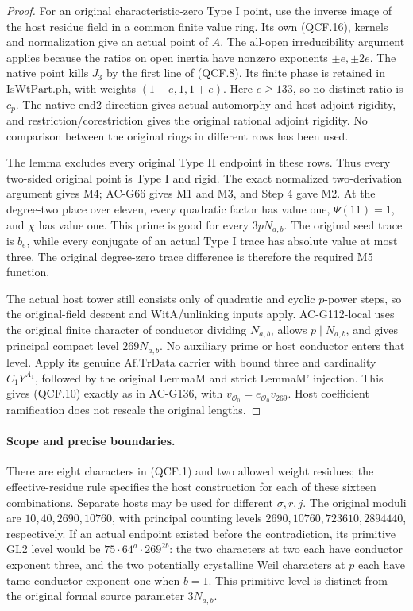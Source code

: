\begin{proof}
For an original characteristic-zero Type I point, use the
inverse image of the host residue field in a common finite
value ring.  Its own (QCF.16), kernels and normalization give
an actual point of \(A\).  The all-open irreducibility argument
applies because the ratios on open inertia have nonzero exponents
\(\pm e,\pm2e\).  The native point kills \(J_3\) by the first
line of (QCF.8).  Its finite phase is retained in
\(\mathrm{IsWtPart.ph}\), with weights \((1-e,1,1+e)\).
Here \(e\ge133\), so no distinct ratio is \(c_p\).
The native end2 direction gives actual automorphy and host
adjoint rigidity, and restriction/corestriction gives the
original rational adjoint rigidity.  No comparison between
the original rings in different rows has been used.

The lemma excludes every original Type II endpoint in these
rows.  Thus every two-sided original point is Type I and rigid.
The exact normalized two-derivation argument gives M4;
AC-G66 gives M1 and M3, and Step 4 gave M2.
At the degree-two place over eleven, every quadratic factor
has value one, \(\Psi(11)=1\), and \(\chi\) has value one.
This prime is good for every \(3pN_{a,b}\).  The original
seed trace is \(b_e\), while every conjugate of an actual
Type I trace has absolute value at most three.  The original
degree-zero trace difference is therefore the required M5 function.

The actual host tower still consists only of quadratic and
cyclic \(p\)-power steps, so the original-field descent and
WitA/unlinking inputs apply.  AC-G112-local uses the original
finite character of conductor dividing \(N_{a,b}\), allows
\(p\mid N_{a,b}\), and gives principal compact level
\(269N_{a,b}\).  No auxiliary prime or host conductor enters
that level.  Apply its genuine \(\mathrm{Af.TrData}\) carrier
with bound three and cardinality \(C_1Y^{A_1}\), followed by
the original LemmaM and strict LemmaM' injection.  This gives
(QCF.10) exactly as in AC-G136, with
\(v_{\mathcal O_0}=e_{\mathcal O_0}v_{269}\).
Host coefficient ramification does not rescale the original lengths.
\end{proof}

\paragraph{Scope and precise boundaries.}
There are eight characters in (QCF.1) and two allowed weight
residues; the effective-residue rule specifies the host construction
for each of these sixteen combinations.  Separate hosts may be used
for different \(\sigma,r,j\).  The original moduli are
\(10,40,2690,10760\), with principal counting levels
\(2690,10760,723610,2894440\), respectively.
If an actual endpoint existed before the contradiction, its primitive
GL2 level would be \(75\cdot64^a\cdot269^{2b}\): the two
characters at two each have conductor exponent three, and the two
potentially crystalline Weil characters at \(p\) each have tame
conductor exponent one when \(b=1\).  This primitive level is
distinct from the original formal source parameter \(3N_{a,b}\).

